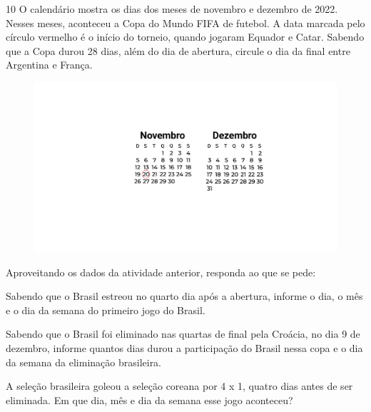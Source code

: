 
\pagebreak

\num{10} O calendário mostra os dias dos meses de novembro e dezembro de
2022. Nesses meses, aconteceu a Copa do Mundo FIFA de futebol. A data
marcada pelo círculo vermelho é o início do torneio, quando jogaram
Equador e Catar. Sabendo que a Copa durou 28 dias, além do dia de abertura, circule o dia da
final entre Argentina e França.


\begin{figure}[htpb!]
\includegraphics[width=\textwidth]{./media/image59_prof.png}
\end{figure}

Aproveitando os dados da atividade anterior, responda ao que se pede:

\begin{escolha}[itemsep=-5pt]
\item Sabendo que o Brasil estreou no quarto dia após a abertura, informe o dia, o
  mês e o dia da semana do primeiro jogo do Brasil.

\item Sabendo que o Brasil foi eliminado nas quartas de final pela Croácia,
  no dia 9 de dezembro, informe quantos dias durou a participação do
  Brasil nessa copa e o dia da semana da eliminação brasileira.

\item A seleção brasileira goleou a seleção coreana por 4 x 1, quatro dias
  antes de ser eliminada. Em que dia, mês e dia da semana esse jogo
  aconteceu?
\end{escolha}

